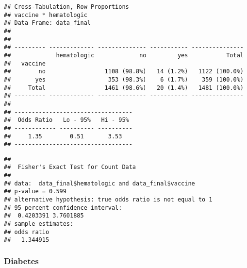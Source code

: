 \documentclass[
]{article}
\newenvironment{Shaded}{\begin{snugshade}}{\end{snugshade}}
\newcommand{\AttributeTok}[1]{\textcolor[rgb]{0.77,0.63,0.00}{#1}}
\newcommand{\ConstantTok}[1]{\textcolor[rgb]{0.00,0.00,0.00}{#1}}
\newcommand{\FunctionTok}[1]{\textcolor[rgb]{0.00,0.00,0.00}{#1}}
\newcommand{\NormalTok}[1]{#1}
\newcommand{\SpecialCharTok}[1]{\textcolor[rgb]{0.00,0.00,0.00}{#1}}
\newcommand{\StringTok}[1]{\textcolor[rgb]{0.31,0.60,0.02}{#1}}
\begin{document}
\begin{verbatim}
## Cross-Tabulation, Row Proportions  
## vaccine * hematologic  
## Data Frame: data_final  
## 
## 
## --------- ------------- -------------- ----------- ---------------
##             hematologic             no         yes           Total
##   vaccine                                                         
##        no                 1108 (98.8%)   14 (1.2%)   1122 (100.0%)
##       yes                  353 (98.3%)    6 (1.7%)    359 (100.0%)
##     Total                 1461 (98.6%)   20 (1.4%)   1481 (100.0%)
## --------- ------------- -------------- ----------- ---------------
## 
## ----------------------------------
##  Odds Ratio   Lo - 95%   Hi - 95% 
## ------------ ---------- ----------
##     1.35        0.51       3.53   
## ----------------------------------
\end{verbatim}

\begin{Shaded}
\end{Shaded}

\begin{verbatim}
## 
##  Fisher's Exact Test for Count Data
## 
## data:  data_final$hematologic and data_final$vaccine
## p-value = 0.599
## alternative hypothesis: true odds ratio is not equal to 1
## 95 percent confidence interval:
##  0.4203391 3.7601885
## sample estimates:
## odds ratio 
##   1.344915
\end{verbatim}

\hypertarget{diabetes}{%
\subsubsection{Diabetes}\label{diabetes}}

\begin{Shaded}
\end{Shaded}
\end{document}
